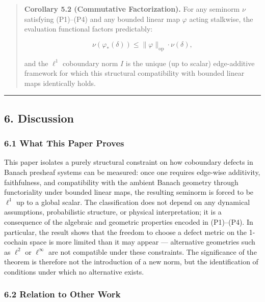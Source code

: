 \documentclass[
]{article}
\begin{document}
\begin{quote}
\textbf{Corollary 5.2 (Commutative Factorization).} For any seminorm
\(\nu\) satisfying (P1)--(P4) and any bounded linear map \(\varphi\)
acting stalkwise, the evaluation functional factors predictably:

\[\nu(\varphi_*(\delta)) \leq \|\varphi\|_{\text{op}} \cdot \nu(\delta),\]

and the \(\ell^1\) coboundary norm \(I\) is the unique (up to scalar)
edge-additive framework for which this structural compatibility with
bounded linear maps identically holds.
\end{quote}

\begin{center}\rule{0.5\linewidth}{0.5pt}\end{center}

\subsection{6. Discussion}\label{discussion}

\subsubsection{6.1 What This Paper Proves}\label{what-this-paper-proves}

This paper isolates a purely structural constraint on how coboundary
defects in Banach presheaf systems can be measured: once one requires
edge-wise additivity, faithfulness, and compatibility with the ambient
Banach geometry through functoriality under bounded linear maps, the
resulting seminorm is forced to be \(\ell^1\) up to a global scalar. The
classification does not depend on any dynamical assumptions,
probabilistic structure, or physical interpretation; it is a consequence
of the algebraic and geometric properties encoded in (P1)--(P4). In
particular, the result shows that the freedom to choose a defect metric
on the 1-cochain space is more limited than it may appear ---
alternative geometries such as \(\ell^2\) or \(\ell^\infty\) are not
compatible under these constraints. The significance of the theorem is
therefore not the introduction of a new norm, but the identification of
conditions under which no alternative exists.

\subsubsection{6.2 Relation to Other Work}\label{relation-to-other-work}
\end{document}
